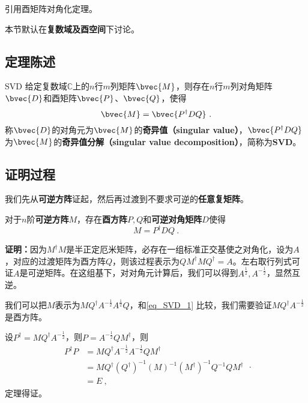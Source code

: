 
\begin{issues}
\issueTODO 引用酉矩阵对角化定理。
\end{issues}



本节默认在\textbf{复数域及酉空间}下讨论。
\subsection{定理陈述}
\begin{theorem}{SVD}
给定复数域$\mathbb{C}$上的$n$行$m$列矩阵$\bvec{M}$，则存在$n$行$m$列对角矩阵$\bvec{D}$和酉矩阵$\bvec{P}$、$\bvec{Q}$，使得
\begin{equation}
\bvec{M} = \bvec{P^{\dagger}DQ}~. 
\end{equation}
称$\bvec{D}$的对角元为$\bvec{M}$的\textbf{奇异值（singular value）}，$\bvec{P^{\dagger}DQ}$为$\bvec{M}$的\textbf{奇异值分解（singular value decomposition）}，简称为\textbf{SVD}。
\end{theorem}


\subsection{证明过程}
我们先从\textbf{可逆方阵}证起，然后再过渡到不要求可逆的\textbf{任意复矩阵}。
\begin{theorem}{}\label{the_SVD_1}
对于$n$阶\textbf{可逆方阵}$M$，存在\textbf{酉方阵}$P,Q$和\textbf{可逆对角矩阵}$D$使得
\begin{equation}\label{eq_SVD_1}
M=P^{\dagger}DQ~.
\end{equation}

\end{theorem}
\textbf{证明：}因为$M^{\dagger}M$是半正定厄米矩阵，必存在一组标准正交基使之对角化，设为$A$，对应的过渡矩阵为酉方阵$Q$，则该过程表示为$QM^{\dagger}MQ^{\dagger}=A$。左右取行列式可证$A$是可逆矩阵。在这组基下，对对角元计算后，我们可以得到$A^{\frac{1}{2}},A^{-\frac{1}{2}}$，显然互逆。

我们可以把$M$表示为$MQ^{\dagger}A^{-\frac{1}{2}}A^{\frac{1}{2}}Q$，和\autoref{eq_SVD_1} 比较，我们需要验证$MQ^{\dagger}A^{-\frac{1}{2}}$是酉方阵。

设$P^{\dagger}=MQ^{\dagger}A^{-\frac{1}{2}}$，则$P=A^{-\frac{1}{2}}QM^{\dagger}$，则
\begin{equation}
\begin{aligned}
P^{\dagger}P&=MQ^{\dagger}A^{-\frac{1}{2}}A^{-\frac{1}{2}}QM^{\dagger}\\
&=MQ^{\dagger}(Q^{\dagger})^{-1}(M)^{-1}(M^{\dagger})^{-1}Q^{-1}QM^{\dagger}\\
&=E~,
\end{aligned}
~.
\end{equation}
定理得证。

